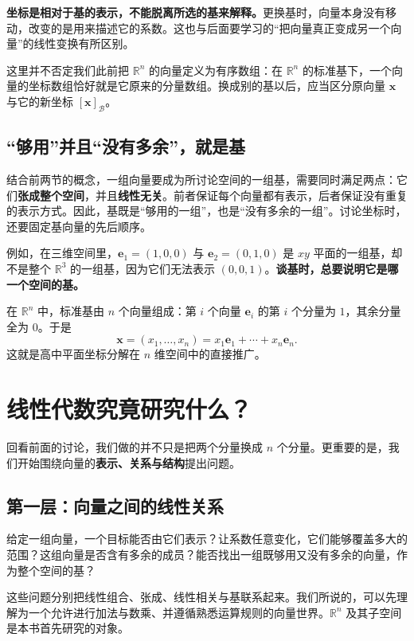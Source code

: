 \documentclass[a4paper,12pt,twoside,openany,fontset=none]{ctexbook}
\numberwithin{equation}{chapter}
\begin{document}
\textbf{坐标是相对于基的表示，不能脱离所选的基来解释。}更换基时，向量本身没有移动，改变的是用来描述它的系数。这也与后面要学习的“把向量真正变成另一个向量”的线性变换有所区别。

这里并不否定我们此前把 $\mathbb{R}^n$ 的向量定义为有序数组：在 $\mathbb{R}^n$ 的标准基下，一个向量的坐标数组恰好就是它原来的分量数组。换成别的基以后，应当区分原向量 $\boldsymbol{x}$ 与它的新坐标 $[\boldsymbol{x}]_{\mathcal{B}}$。

\subsection*{“够用”并且“没有多余”，就是基}

结合前两节的概念，一组向量要成为所讨论空间的一组基，需要同时满足两点：它们\textbf{张成整个空间}，并且\textbf{线性无关}。前者保证每个向量都有表示，后者保证没有重复的表示方式。因此，基既是“够用的一组”，也是“没有多余的一组”。讨论坐标时，还要固定基向量的先后顺序。

例如，在三维空间里，$\boldsymbol{e}_1=(1,0,0)$ 与 $\boldsymbol{e}_2=(0,1,0)$ 是 $xy$ 平面的一组基，却不是整个 $\mathbb{R}^3$ 的一组基，因为它们无法表示 $(0,0,1)$。\textbf{谈基时，总要说明它是哪一个空间的基。}

在 $\mathbb{R}^n$ 中，标准基由 $n$ 个向量组成：第 $i$ 个向量 $\boldsymbol{e}_i$ 的第 $i$ 个分量为 $1$，其余分量全为 $0$。于是
\[
    \boldsymbol{x}=(x_1,\ldots,x_n)
    =x_1\boldsymbol{e}_1+\cdots+x_n\boldsymbol{e}_n.
\]
这就是高中平面坐标分解在 $n$ 维空间中的直接推广。

\section{线性代数究竟研究什么？}
\label{sec:zero-subject}

回看前面的讨论，我们做的并不只是把两个分量换成 $n$ 个分量。更重要的是，我们开始围绕向量的\textbf{表示、关系与结构}提出问题。

\subsection*{第一层：向量之间的线性关系}

给定一组向量，一个目标能否由它们表示？让系数任意变化，它们能够覆盖多大的范围？这组向量是否含有多余的成员？能否找出一组既够用又没有多余的向量，作为整个空间的基？

这些问题分别把线性组合、张成、线性相关与基联系起来。我们所说的，可以先理解为一个允许进行加法与数乘、并遵循熟悉运算规则的向量世界。$\mathbb{R}^n$ 及其子空间是本书首先研究的对象。
\end{document}
